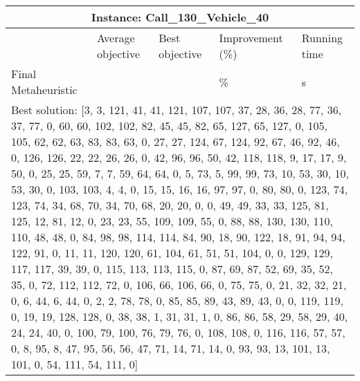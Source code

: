 \documentclass[]{article}
\begin{document}
\begin{table}[!ht]
	\hskip-1.3cm\begin{tabular}{|m{3.2cm}|>{\centering\arraybackslash}m{2.8cm}|>{\centering\arraybackslash}m{2.8cm}|>{\centering\arraybackslash}m{2.8cm}|>{\centering\arraybackslash}m{2.8cm}|}
		\hline
		\multicolumn{5}{|c|}{Instance: Call\_130\_Vehicle\_40}\\
		\hline
		& Average objective & Best objective & Improvement (\%) & Running time\\
		\hline
		Final Metaheuristic & 16568530.50 & 16424758.00 & 78.496880 \% & 900.028 s\\
		\hline
		\multicolumn{5}{|m{14cm}|}{Best solution: [3, 3, 121, 41, 41, 121, 107, 107, 37, 28, 36, 28, 77, 36, 37, 77, 0, 60, 60, 102, 102, 82, 45, 45, 82, 65, 127, 65, 127, 0, 105, 105, 62, 62, 63, 83, 83, 63, 0, 27, 27, 124, 67, 124, 92, 67, 46, 92, 46, 0, 126, 126, 22, 22, 26, 26, 0, 42, 96, 96, 50, 42, 118, 118, 9, 17, 17, 9, 50, 0, 25, 25, 59, 7, 7, 59, 64, 64, 0, 5, 73, 5, 99, 99, 73, 10, 53, 30, 10, 53, 30, 0, 103, 103, 4, 4, 0, 15, 15, 16, 16, 97, 97, 0, 80, 80, 0, 123, 74, 123, 74, 34, 68, 70, 34, 70, 68, 20, 20, 0, 0, 49, 49, 33, 33, 125, 81, 125, 12, 81, 12, 0, 23, 23, 55, 109, 109, 55, 0, 88, 88, 130, 130, 110, 110, 48, 48, 0, 84, 98, 98, 114, 114, 84, 90, 18, 90, 122, 18, 91, 94, 94, 122, 91, 0, 11, 11, 120, 120, 61, 104, 61, 51, 51, 104, 0, 0, 129, 129, 117, 117, 39, 39, 0, 115, 113, 113, 115, 0, 87, 69, 87, 52, 69, 35, 52, 35, 0, 72, 112, 112, 72, 0, 106, 66, 106, 66, 0, 75, 75, 0, 21, 32, 32, 21, 0, 6, 44, 6, 44, 0, 2, 2, 78, 78, 0, 85, 85, 89, 43, 89, 43, 0, 0, 119, 119, 0, 19, 19, 128, 128, 0, 38, 38, 1, 31, 31, 1, 0, 86, 86, 58, 29, 58, 29, 40, 24, 24, 40, 0, 100, 79, 100, 76, 79, 76, 0, 108, 108, 0, 116, 116, 57, 57, 0, 8, 95, 8, 47, 95, 56, 56, 47, 71, 14, 71, 14, 0, 93, 93, 13, 101, 13, 101, 0, 54, 111, 54, 111, 0]}\\
		\hline
	\end{tabular}
\end{table}
\end{document}
